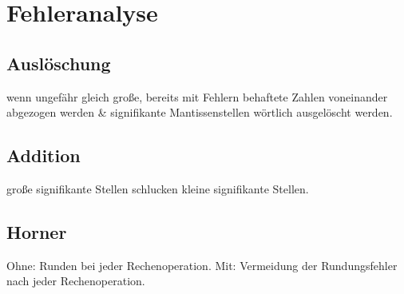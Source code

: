 \section{Fehleranalyse}
\subsection{Auslöschung}
wenn ungefähr gleich große, bereits mit Fehlern behaftete Zahlen voneinander abgezogen werden \& signifikante Mantissenstellen wörtlich ausgelöscht werden.
\subsection{Addition}
große signifikante Stellen schlucken kleine signifikante Stellen.
\subsection{Horner}
Ohne: Runden bei jeder Rechenoperation. Mit: Vermeidung der Rundungsfehler nach jeder Rechenoperation.